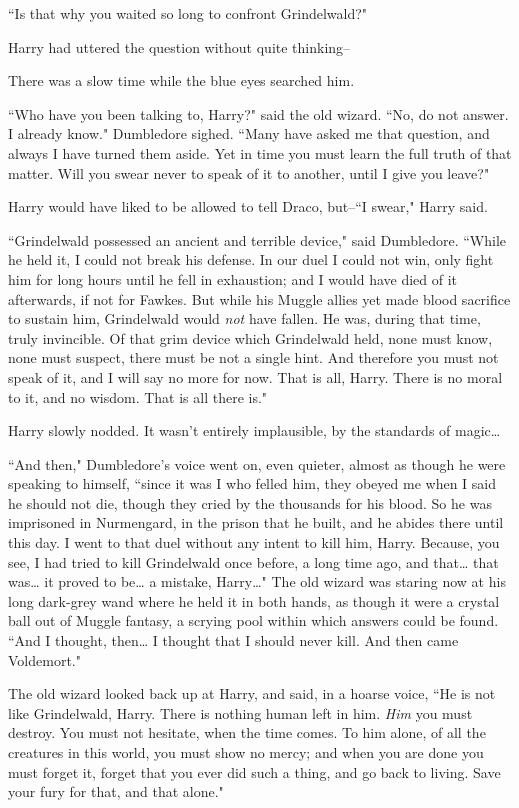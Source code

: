 ``Is that why you waited so long to confront Grindelwald?"

Harry had uttered the question without quite thinking\---

There was a slow time while the blue eyes searched him.

``Who have you been talking to, Harry?" said the old wizard. ``No, do not answer. I already know." Dumbledore sighed. ``Many have asked me that question, and always I have turned them aside. Yet in time you must learn the full truth of that matter. Will you swear never to speak of it to another, until I give you leave?"

Harry would have liked to be allowed to tell Draco, but\---``I swear," Harry said.

``Grindelwald possessed an ancient and terrible device," said Dumbledore. ``While he held it, I could not break his defense. In our duel I could not win, only fight him for long hours until he fell in exhaustion; and I would have died of it afterwards, if not for Fawkes. But while his Muggle allies yet made blood sacrifice to sustain him, Grindelwald would \emph{not} have fallen. He was, during that time, truly invincible. Of that grim device which Grindelwald held, none must know, none must suspect, there must be not a single hint. And therefore you must not speak of it, and I will say no more for now. That is all, Harry. There is no moral to it, and no wisdom. That is all there is."

Harry slowly nodded. It wasn't entirely implausible, by the standards of magic{\ldots}

``And then," Dumbledore's voice went on, even quieter, almost as though he were speaking to himself, ``since it was I who felled him, they obeyed me when I said he should not die, though they cried by the thousands for his blood. So he was imprisoned in Nurmengard, in the prison that he built, and he abides there until this day. I went to that duel without any intent to kill him, Harry. Because, you see, I had tried to kill Grindelwald once before, a long time ago, and that{\ldots} that was{\ldots} it proved to be{\ldots} a mistake, Harry{\ldots}" The old wizard was staring now at his long dark-grey wand where he held it in both hands, as though it were a crystal ball out of Muggle fantasy, a scrying pool within which answers could be found. ``And I thought, then{\ldots} I thought that I should never kill. And then came Voldemort."

The old wizard looked back up at Harry, and said, in a hoarse voice, ``He is not like Grindelwald, Harry. There is nothing human left in him. \emph{Him} you must destroy. You must not hesitate, when the time comes. To him alone, of all the creatures in this world, you must show no mercy; and when you are done you must forget it, forget that you ever did such a thing, and go back to living. Save your fury for that, and that alone."


